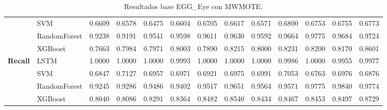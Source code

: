 \begin{table}[h]
\begin{adjustbox}{max width=15cm}
\begin{tabular}{|c|l|r|r|r|r|r|r|r|r|r|r|r|}
			& SVM &  0.6609 &  0.6578 &  0.6475 &  0.6604 &  0.6705 &  0.6617 &  0.6571 &  0.6800 &  0.6753 &  0.6755 &  0.6773 \\
			& RandomForest &  0.9238 &  0.9191 &  0.9541 &  0.9598 &  0.9611 &  0.9630 &  0.9592 &  0.9664 &  0.9775 &  0.9684 &  0.9724 \\
			& XGBoost &  0.7663 &  0.7984 &  0.7971 &  0.8003 &  0.7890 &  0.8215 &  0.8000 &  0.8231 &  0.8200 &  0.8170 &  0.8601 \\
			\hline
			\textbf{Recall} & LSTM &  1.0000 &  1.0000 &  1.0000 &  0.9993 &  1.0000 &  1.0000 &  1.0000 &  0.9986 &  1.0000 &  0.9955 &  0.9977 \\
			& SVM &  0.6847 &  0.7127 &  0.6957 &  0.6971 &  0.6921 &  0.6975 &  0.6991 &  0.7053 &  0.6763 &  0.6976 &  0.6876 \\
			& RandomForest &  0.9245 &  0.9286 &  0.9486 &  0.9402 &  0.9517 &  0.9651 &  0.9564 &  0.9571 &  0.9775 &  0.9840 &  0.9774 \\
			& XGBoost &  0.8040 &  0.8086 &  0.8291 &  0.8364 &  0.8482 &  0.8540 &  0.8434 &  0.8467 &  0.8453 &  0.8497 &  0.8729 \\
			\hline
		\end{tabular}
	\end{adjustbox}
	\caption{Resultados base EGG\_Eye con MWMOTE.}
	\label{tab:EGGEyeMWMOTE}
\end{table}
